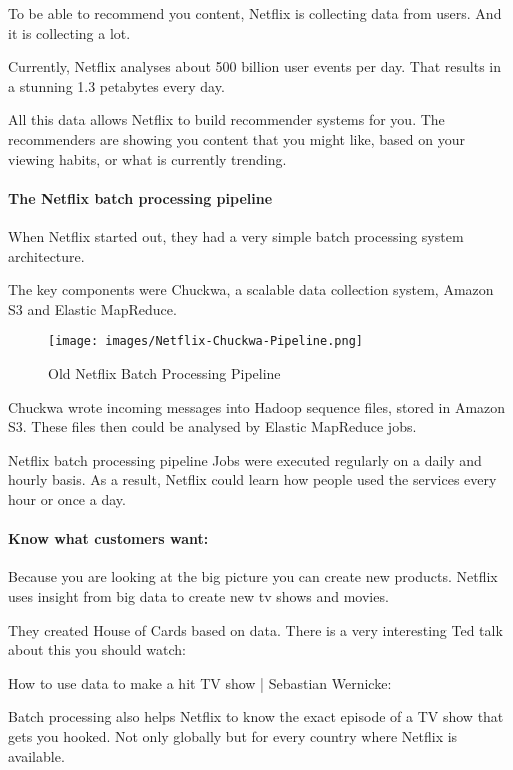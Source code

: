 \documentclass[12pt, numbers=noenddot]{scrreprt} %
\begin{document}
To be able to recommend you content, Netflix is collecting data from users. And it is collecting a lot.

Currently, Netflix analyses about 500 billion user events per day. That results in a stunning 1.3 petabytes every day.

All this data allows Netflix to build recommender systems for you. The recommenders are showing you content that you might like, based on your viewing habits, or what is currently trending.

\paragraph{The Netflix batch processing pipeline}
When Netflix started out, they had a very simple batch processing system architecture.

The key components were Chuckwa, a scalable data collection system, Amazon S3 and Elastic MapReduce.

\begin{figure}[htbp]
  \centering
     \texttt{[image: images/Netflix-Chuckwa-Pipeline.png]}
  \caption{Old Netflix Batch Processing Pipeline}
  \label{fig:Bild1}
\end{figure}

Chuckwa wrote incoming messages into Hadoop sequence files, stored in Amazon S3. These files then could be analysed by Elastic MapReduce jobs.

Netflix batch processing pipeline
Jobs were executed regularly on a daily and hourly basis. As a result, Netflix could learn how people used the services every hour or once a day.

\paragraph{Know what customers want:}

Because you are looking at the big picture you can create new products. Netflix uses insight from big data to create new tv shows and movies.

They created House of Cards based on data. There is a very interesting Ted talk about this you should watch:

How to use data to make a hit TV show | Sebastian Wernicke:


Batch processing also helps Netflix to know the exact episode of a TV show that gets you hooked. Not only globally but for every country where Netflix is available.
\end{document}
